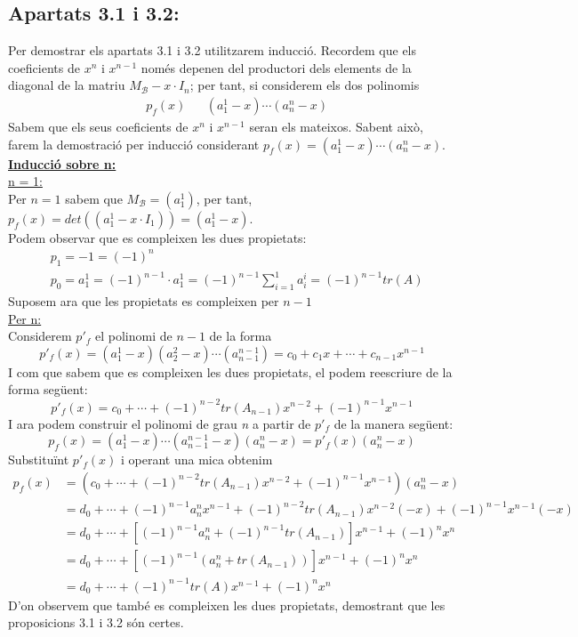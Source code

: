 \documentclass[a4paper, 11pt]{article}
\newcommand{\B}{\mathcal{B}}
\begin{document}
    \subsection*{Apartats 3.1 i 3.2:}
    Per demostrar els apartats 3.1 i 3.2 utilitzarem inducci\'o. Recordem que els coeficients de $x^n$ i $x^{n-1}$ nom\'es depenen del productori dels elements de la diagonal de la matriu $M_\B -x\cdot I_n$; per tant, si considerem els dos polinomis
    \begin{align*}
        &p_f(x) & &(a_1^1 -x)\cdots(a_n^n -x)
    \end{align*}
    Sabem que els seus coeficients de $x^n$ i $x^{n-1}$ seran els mateixos. Sabent aix\`o, farem la demostraci\'o per inducci\'o considerant $p_f(x) = (a_1^1 -x)\cdots(a_n^n -x)$.\\
    \textbf{\underline{Inducci\'o sobre n:}}\\
    \underline{n = 1:}\\
    Per $n = 1$ sabem que $M_\B = (a_1^1)$, per tant, $p_f(x) = det((a^1_1 -x\cdot I_1)) = (a_1^1 -x)$.\\
    Podem observar que es compleixen les dues propietats:
    \begin{align*}
        &p_1 = -1 = (-1)^n\\
        &p_0 = a^1_1 = (-1)^{n-1}\cdot a^1_1 = (-1)^{n-1}\sum_{i = 1}^1 a^i_i = (-1)^{n-1} tr(A)
    \end{align*}
    Suposem ara que les propietats es compleixen per $n-1$\\
    \underline{Per n:}\\
    Considerem $p'_f$ el polinomi de $n-1$ de la forma
    $$
        p'_f(x) = (a_1^1 -x)(a_2^2 -x)\cdots (a_{n-1}^{n-1}) = c_0 + c_1x + \cdots + c_{n-1}x^{n-1}
    $$
    I com que sabem que es compleixen les dues propietats, el podem reescriure de la forma seg\"uent:
    $$
        p'_f(x) = c_0 + \cdots + (-1)^{n-2} tr(A_{n-1})x^{n-2} + (-1)^{n-1}x^{n-1}
    $$
    I ara podem construir el polinomi de grau \emph{n} a partir de $p'_f$ de la manera seg\"uent:
    $$
        p_f(x) = (a_1^1 -x) \cdots (a_{n-1}^{n-1}-x)(a_n^n -x) = p'_f(x) (a_n^n -x)
    $$
    Substitu\"int $p'_f(x)$ i operant una mica obtenim
    \begin{align*}
        p_f(x) &= (c_0 + \cdots + (-1)^{n-2} tr(A_{n-1})x^{n-2} + (-1)^{n-1}x^{n-1})(a_n^n -x)\\
        &= d_0 + \cdots + (-1)^{n-1}a_n^n x^{n-1} + (-1)^{n-2} tr(A_{n-1}) x^{n-2} (-x) + (-1)^{n-1} x^{n-1} (-x)\\
        &= d_0 + \cdots + \left[ (-1)^{n-1} a_n^n + (-1)^{n-1} tr(A_{n-1}) \right] x^{n-1} + (-1)^n x^n\\
        &= d_0 + \cdots + \left[ (-1)^{n-1}(a_n^n + tr(A_{n-1})) \right] x^{n-1} + (-1)^n x^n\\
        &= d_0 + \cdots + (-1)^{n-1} tr(A) x^{n-1} + (-1)^n x^n
    \end{align*}
    D'on observem que tamb\'e es compleixen les dues propietats, demostrant que les proposicions 3.1 i 3.2 s\'on certes.
\end{document}
